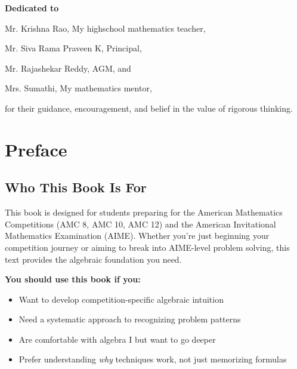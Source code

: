 \documentclass[12pt]{extarticle}
\begin{document}
\thispagestyle{empty}
\vspace*{\fill}
\begin{center}
\Large

\textbf{Dedicated to}

\vspace{1cm}

Mr. Krishna Rao, My highschool mathematics teacher,

Mr. Siva Rama Praveen K, Principal,

Mr. Rajashekar Reddy, AGM, and

Mrs. Sumathi, My mathematics mentor,

\vspace{1cm}

for their guidance, encouragement, and belief in the value of rigorous thinking.
\end{center}
\vspace*{\fill}

\newpage

\tableofcontents
\newpage

\section*{Preface}

\subsection*{Who This Book Is For}

This book is designed for students preparing for the American Mathematics Competitions (AMC 8, AMC 10, AMC 12) and the American Invitational Mathematics Examination (AIME). Whether you're just beginning your competition journey or aiming to break into AIME-level problem solving, this text provides the algebraic foundation you need.

\textbf{You should use this book if you:}
\begin{itemize}
    \item Want to develop competition-specific algebraic intuition
    \item Need a systematic approach to recognizing problem patterns
    \item Are comfortable with algebra I but want to go deeper
    \item Prefer understanding \emph{why} techniques work, not just memorizing formulas
\end{itemize}
\end{document}
